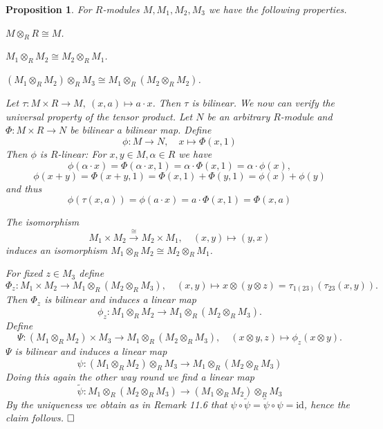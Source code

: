 \documentclass[11pt]{book}
\newtheorem{proposition}[theorem]{Proposition}
\theoremstyle{nonumberbreak}
\newenvironment{pr}[1][]{\ifthenelse{\equal{#1}{}}{\proof}{\proof[#1]}\rm}{\endproof}
\begin{document}
\begin{spacing}{1.3}
\begin{proposition} %
For $R$-modules $M, M_1, M_2, M_3$ we have the following properties.
\begin{compactenum}
\item $M \otimes_R R \cong M$.
\item $M_1 \otimes_R M_2 \cong M_2 \otimes_R M_1$.
\item $\left(M_1 \otimes_R M_2 \right) \otimes_R M_3 \cong M_1 \otimes_R \left(M_2 \otimes_R M_2 \right)$.
\end{compactenum}
\begin{pr}
\begin{compactenum}
\item Let $\tau: M \times R \longrightarrow M, \ (x,a) \mapsto a \cdot x$.
Then $\tau$ is bilinear. We now can verify the universal property of the tensor product.
Let $N$ be an arbitrary $R$-module and
${\Phi: M \times R \longrightarrow N}$
be bilinear a bilinear map. Define
$$\phi: M \longrightarrow N, \quad x \mapsto \Phi(x,1)$$
Then $\phi$ is $R$-linear: For $x,y \in M, \alpha \in R$ we have 
$$\phi(\alpha \cdot x)= \Phi(\alpha \cdot x,1)= \alpha \cdot \Phi(x,1)= \alpha \cdot \phi(x),$$
$$\phi(x+y)= \Phi(x+y,1)= \Phi(x,1)+ \Phi(y,1)= \phi(x)+\phi(y)$$
and thus
$$\phi\left(\tau(x,a)\right)= \phi(a\cdot x)=a \cdot \Phi(x,1)= \Phi(x,a)$$
\item The isomorphism 
$$M_1 \times M_2 \overset{\cong}{\longrightarrow} M_2 \times M_1, \quad (x,y) \mapsto (y,x)$$
induces an isomorphism $M_1 \otimes_R M_2 \cong M_2 \otimes_R M_1$.
\item For fixed $z \in M_3$ define
$$\Phi_z: M_1 \times M_2 \longrightarrow M_1 \otimes_R \left(M_2 \otimes_R M_3 \right), \quad (x,y) \mapsto x \otimes (y \otimes z)=\tau_{1(23)}\left(\tau_{23}(x,y)\right).$$
Then $\Phi_z$ is bilinear and induces a linear map
$$\phi_z: M_1 \otimes_R M_2 \longrightarrow M_1 \otimes_R \left(M_2 \otimes_R M_3 \right).$$
Define
$$\Psi: \left(M_1 \otimes_R M_2 \right) \times M_3 \longrightarrow M_1 \otimes_R \left(M_2 \otimes_R M_3 \right), \quad (x \otimes y, z) \mapsto \phi_z(x \otimes y).$$
$\Psi$ is bilinear and induces a linear map
$$\psi: \left(M_1 \otimes_R M_2\right) \otimes_R M_3 \longrightarrow M_1 \otimes_R \left(M_2 \otimes_R M_3 \right)$$
Doing this again the other way round we find a linear map
$$\tilde{\psi}: M_1 \otimes_R \left(M_2 \otimes_R M_3 \right) \longrightarrow \left(M_1 \otimes_R M_2\right) \otimes_R M_3$$
By the uniqueness we obtain as in Remark 11.6 that $\psi \circ \tilde{\psi} = \tilde{\psi} \circ \psi = \textrm{id}$, hence the claim follows. $\hfill \Box$
\end{compactenum}
\end{pr}
\end{proposition}




\end{spacing}
\end{document}
